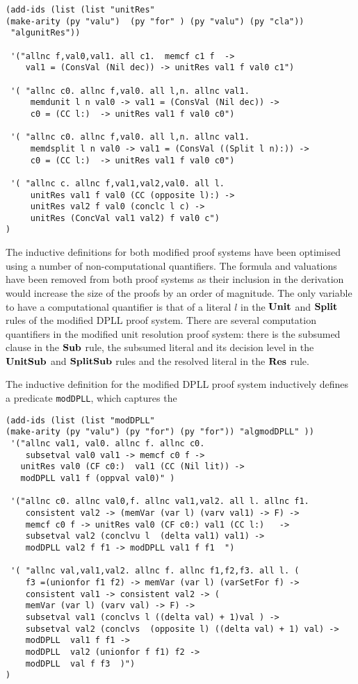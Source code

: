 \begin{lstlisting}[caption = The Inductive Definition for the Modified Unit Resolution Proof System in Minlog, label = def:moduresminlog]
(add-ids (list (list "unitRes" 
(make-arity (py "valu")  (py "for" ) (py "valu") (py "cla")) 
 "algunitRes"))

 '("allnc f,val0,val1. all c1.  memcf c1 f  -> 
    val1 = (ConsVal (Nil dec)) -> unitRes val1 f val0 c1")

 '( "allnc c0. allnc f,val0. all l,n. allnc val1. 
     memdunit l n val0 -> val1 = (ConsVal (Nil dec)) -> 
     c0 = (CC l:)  -> unitRes val1 f val0 c0")

 '( "allnc c0. allnc f,val0. all l,n. allnc val1. 
     memdsplit l n val0 -> val1 = (ConsVal ((Split l n):)) -> 
     c0 = (CC l:)  -> unitRes val1 f val0 c0")
 
 '( "allnc c. allnc f,val1,val2,val0. all l. 
     unitRes val1 f val0 (CC (opposite l):) ->  
     unitRes val2 f val0 (conclc l c) -> 
     unitRes (ConcVal val1 val2) f val0 c")
)
\end{lstlisting}
The inductive definitions for both modified proof systems have been optimised using a number of non-computational quantifiers. The formula and valuations have been removed from both proof systems as their inclusion in the derivation would increase  the size of the proofs by an order of magnitude. The only variable to have a computational quantifier is that of a literal $l$ in the $\mathbf{Unit}$ and $\mathbf{Split}$ rules of the modified DPLL proof system.  There are several computation quantifiers in the modified unit resolution proof system: there is the subsumed clause in the $\mathbf{Sub}$ rule, the subsumed literal and its decision level in the $\mathbf{UnitSub}$ and $\mathbf{SplitSub}$ rules and the resolved literal in the $\mathbf{Res}$ rule.

The inductive definition for the modified DPLL proof system inductively defines a predicate \texttt{modDPLL}, which captures the

\begin{lstlisting}[caption = The Inductive Definition for the Modified DPLL Proof System in Minlog, label = def:moddpllminlog]
(add-ids (list (list "modDPLL" 
(make-arity (py "valu") (py "for") (py "for")) "algmodDPLL" ))
 '("allnc val1, val0. allnc f. allnc c0. 
    subsetval val0 val1 -> memcf c0 f -> 
   unitRes val0 (CF c0:)  val1 (CC (Nil lit)) ->  
   modDPLL val1 f (oppval val0)" )
        
 '("allnc c0. allnc val0,f. allnc val1,val2. all l. allnc f1. 
    consistent val2 -> (memVar (var l) (varv val1) -> F) ->  
    memcf c0 f -> unitRes val0 (CF c0:) val1 (CC l:)   -> 
    subsetval val2 (conclvu l  (delta val1) val1) -> 
    modDPLL val2 f f1 -> modDPLL val1 f f1  ")

 '( "allnc val,val1,val2. allnc f. allnc f1,f2,f3. all l. ( 
    f3 =(unionfor f1 f2) -> memVar (var l) (varSetFor f) -> 
    consistent val1 -> consistent val2 -> (
    memVar (var l) (varv val) -> F) ->  
    subsetval val1 (conclvs l ((delta val) + 1)val ) -> 
    subsetval val2 (conclvs  (opposite l) ((delta val) + 1) val) ->
    modDPLL  val1 f f1 ->
    modDPLL  val2 (unionfor f f1) f2 ->
    modDPLL  val f f3  )")
)
\end{lstlisting}

